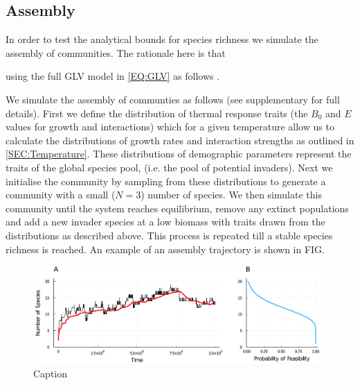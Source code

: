 \documentclass{article}
\begin{document}
\subsection{Assembly}

In order to test the analytical bounds for species richness we simulate the assembly of communities. The rationale here is that 

using the full GLV model in \cref{EQ:GLV} as follows . 

We simulate the assembly of communties as follows (see supplementary for full details). First we define the distribution of thermal response traits (the $B_0$ and $E$ values for growth and interactions) which for a given temperature allow us to calculate the distributions of growth rates and interaction strengths as outlined in \cref{SEC:Temperature}. These distributions of demographic parameters represent the traits of the global species pool, (i.e. the pool of potential invaders). Next we initialise the community by sampling from these distributions to generate a community with a small ($N=3$) number of species. We then simulate this community until the system reaches equilibrium, remove any extinct populations and add a new invader species at a low biomass with traits drawn from the distributions as described above. This process is repeated till a stable species richness is reached. An example of an assembly trajectory is shown in FIG. 

\begin{figure}
    \centering
    \includegraphics[width = \textwidth]{docs/Figures/Fig_2.pdf}
    \caption{Caption}
    \label{Fig:Assembly_Example}
\end{figure}
\end{document}
